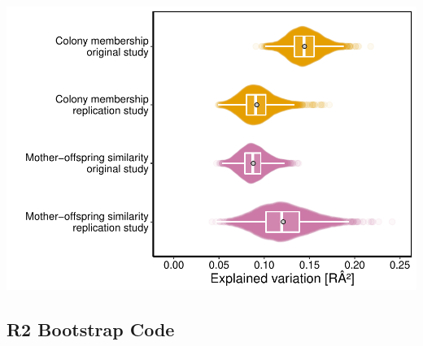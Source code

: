 \documentclass[]{article}
\begin{document}
\includegraphics{SealScent_SI_Markdown_2020_1_files/figure-latex/Effect size estimate plot-1.pdf}

\subsection{R2 Bootstrap Code}\label{r2-bootstrap-code}
\end{document}
